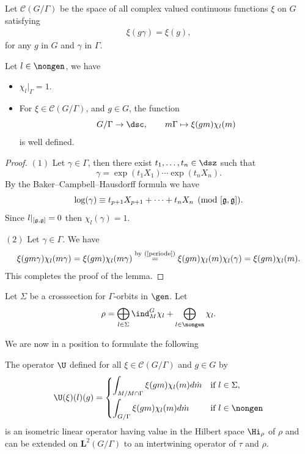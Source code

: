 Let $\mathcal{C}(G/\Gamma)$ be the space of all complex valued
continuous functions $\xi$ on $G$ satisfying
\begin{gather}\label{periode}
\xi(g\gamma)= \xi(g), \end{gather}
 for any $g$ in $G$ and $\gamma$
in $\Gamma$.




\begin{lemma}\label{periode2} Let $l\in \nongen$, we have
\begin{itemize}\itemsep=0pt
  \item[$(1)$] $\chi_l\vert_{\Gamma}=1$.
  \item[$(2)$] For $\xi \in \mathcal{C}(G/\Gamma)$, and $g\in G$, the function
\[
G/\Gamma\rightarrow \dsc,\qquad m\Gamma\mapsto \xi(gm)
\chi_l(m)
\]
is well defined.
\end{itemize}
\end{lemma}

\begin{proof} $(1)$ Let $\gamma\in \Gamma$, then there exist
$t_1, \ldots, t_n\in \dsz$ such that
\[
\gamma=\exp(t_1X_1)\cdots \exp(t_nX_n).
\]
By the Baker--Campbell--Hausdorf\/f formula we have
\[
\log(\gamma)\equiv t_{p+1}X_{p+1}+\cdots+t_n X_n\pmod{[\frak g,
\frak g]}.
\]
 Since $l\vert_{[\frak g, \frak g]}=0$ then $\chi_l(\gamma)=1$.


$(2)$ Let $\gamma\in \Gamma$. We have
\begin{gather*}
 \xi(gm\gamma)
\chi_l(m\gamma)
   = \xi(gm)
\chi_l(m\gamma) \overset{\text{by (\ref{periode})}}{=}    \xi(gm) \chi_l(m) \chi_l(\gamma)
 = \xi(gm) \chi_l(m).
\end{gather*}
 This completes the proof of the lemma.
\end{proof}

Let $\Sigma$ be a crosssection for $\Gamma$-orbits in $\gen$. Let
\begin{gather*}
 \rho =   \bigoplus_{l \in \Sigma}\ind_M^G\chi_l +
\bigoplus_{l\in \nongen} \chi_l.
\end{gather*}


We are now in a position  to formulate the following

\begin{theorem}\label{des-operator-special}
The operator  $\U$ defined for all  $\xi\in \mathcal{C}(G/\Gamma)$
and $g\in G$ by
 \begin{gather*}%
 \U(\xi)(l)(g) = \begin{cases}
\displaystyle     \int_{M/M\cap \Gamma} \xi(gm) \chi_l(m) d\dot{m} & \mbox{if }  l\in \Sigma,\vspace{1mm}\\
\displaystyle     \int_{G/ \Gamma} \xi(gm) \chi_l(m) d\dot{m} & \mbox{if }  l\in \nongen
    \end{cases}
\end{gather*}
 is an isometric linear operator having value in the Hilbert space
 $\Hi_\rho$ of $\rho$  and can be extended on
  $\mathbf{L}^2(G/\Gamma)$ to an
intertwining operator of $\tau$ and $\rho$.
\end{theorem}


